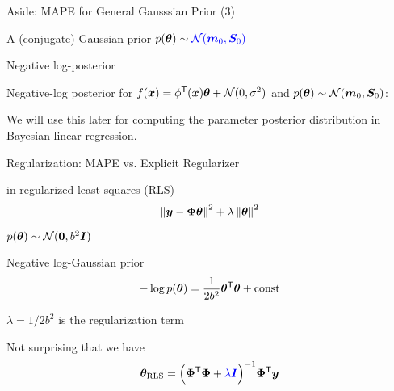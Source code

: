 \documentclass[handout,fleqn,aspectratio=169]{beamer}
\begin{document}
\begin{frame}{Aside: MAPE for General Gausssian Prior (3)}

\plitemsep 0.07in

\bci 

\item \exam A (conjugate) Gaussian prior $p(\bm{\theta}) \sim {\color{blue} \ensuremath{\mathcal N}(\bm{m}_0, \bm{S}_0)}$

\item Negative log-posterior

\medskip

\begin{tcolorbox}[width=14cm,colback=red!5!white,colframe=red!75!black]
Negative-log posterior for $f(\bm{x}) = {\phi}^{\mathsf{T}}(\bm{x})\bm{\theta} + \mathcal N(0,\sigma^2)$ and $p(\bm{\theta}) \sim \mathcal N(\bm{m}_0, \bm{S}_0)$:
\vspace{-0.1cm}
\end{tcolorbox}

\item We will use this later for computing the parameter posterior distribution in Bayesian linear regression.
\eci

\end{frame}


\begin{frame}{Regularization: MAPE vs. Explicit Regularizer}


\plitemsep 0.1in


\bci 

\item {} in regularized least squares (RLS)
$$
\left \lVert \bm{y} - \bm{\Phi}\bm{\theta} \right \rVert^2 + \lambda \left \lVert \bm{\theta} \right \rVert^2
$$

\item {} $p(\bm{\theta}) \sim \mathcal N(\bm{0},b^2 \bm{I})$
\bci
\item Negative log-Gaussian prior
$$
-\log p(\bm{\theta}) = \frac{1}{2b^2}{\bm{\theta}}^{\mathsf{T}}\bm{\theta} + \text{const}
$$
\item $\lambda = 1/2b^2$ is the regularization term
\eci

\item Not surprising that we have
$$
\bm{\theta}_{\text{RLS}} = {
\Big({\bm{\Phi}}^{\mathsf{T}} \bm{\Phi} + {\color{blue} \lambda \bm{I}} \Big)
}^{-1} {\bm{\Phi}}^{\mathsf{T}} \bm{y}
$$
\eci

\end{frame}
\end{document}
